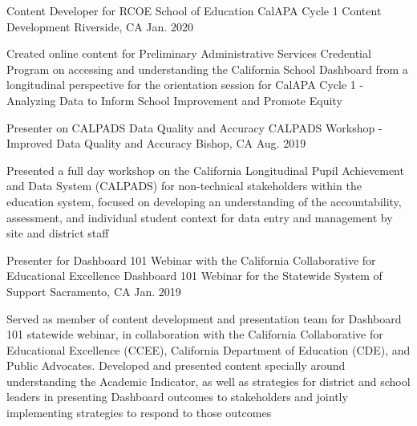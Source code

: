 

\begin{cventries}

  \cventry
    {Content Developer for RCOE School of Education} %
    {CalAPA Cycle 1 Content Development} %
    {Riverside, CA} %
    {Jan. 2020} %
    {
      \begin{cvitems} %
        \item {Created online content for Preliminary Administrative Services Credential 
        Program on accessing and understanding the California School Dashboard from a 
        longitudinal perspective for the orientation session for CalAPA Cycle 1 - 
        Analyzing Data to Inform School Improvement and Promote Equity }
      \end{cvitems}
    }

  \cventry
    {Presenter on CALPADS Data Quality and Accuracy} %
    {CALPADS Workshop - Improved Data Quality and Accuracy} %
    {Bishop, CA} %
    {Aug. 2019} %
    {
      \begin{cvitems} %
        \item {Presented a full day workshop on the California Longitudinal Pupil 
        Achievement and Data System (CALPADS) for non-technical stakeholders within the 
        education system, focused on developing an understanding of the accountability, 
        assessment, and individual student context for data entry and management by site 
        and district staff}
      \end{cvitems}
    }

  \cventry
    {Presenter for Dashboard 101 Webinar with the California Collaborative for
    Educational Excellence} %
    {Dashboard 101 Webinar for the Statewide System of Support} %
    {Sacramento, CA} %
    {Jan. 2019} %
    {
      \begin{cvitems} %
        \item {Served as member of content development and presentation team for
        Dashboard 101 statewide webinar, in collaboration with the California
        Collaborative for Educational Excellence (CCEE), California Department of
        Education (CDE), and Public Advocates. Developed and presented content
        specially around understanding the Academic Indicator, as well as strategies
        for district and school leaders in presenting Dashboard outcomes to
        stakeholders and jointly implementing strategies to respond to those
        outcomes}
      \end{cvitems}
    }



\end{cventries}
